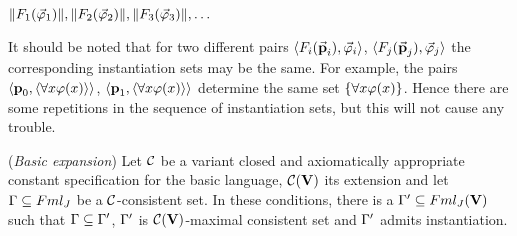 \begin{center}
	$\Arrowvert F_{1}( \vec{\varphi}_{1}) \Arrowvert, \Arrowvert F_{2}( \vec{\varphi}_{2}) \Arrowvert, \Arrowvert F_{3}( \vec{\varphi}_{3}) \Arrowvert, \dots $
\end{center}  


\qquad It should be noted that for two different pairs $\langle F_{i}(\vec{\textbf{p}}_{i}), \vec{\varphi}_{i} \rangle$, $\langle F_{j}(\vec{\textbf{p}}_{j}), \vec{\varphi}_{j} \rangle$ the corresponding instantiation sets may be the same. For example, the pairs $\langle \textbf{p}_{0}, \langle \forall x \varphi (x)\rangle\rangle$, $\langle \textbf{p}_{1}, \langle \forall x \varphi (x)\rangle \rangle$ determine the same set $\{\forall x \varphi(x)\}$. Hence there are some repetitions in the sequence of instantiation sets, but this will not cause any trouble. 




\begin{pro}(\textit{Basic expansion})
	Let $\mathcal{C}$ be a variant closed and axiomatically appropriate constant specification for the basic language, $\mathcal{C}(\textbf{V})$ its extension and let $\Gamma \subseteq Fml_{J}$ be a $\mathcal{C}$-consistent set. In these conditions, there is a $\Gamma^{\prime} \subseteq Fml_{J}(\textbf{V})$ such that $\Gamma \subseteq \Gamma^{\prime}$, $\Gamma^{\prime}$ is $\mathcal{C}(\textbf{V})$-maximal consistent set and $\Gamma^{\prime}$ admits instantiation.  
\end{pro}


